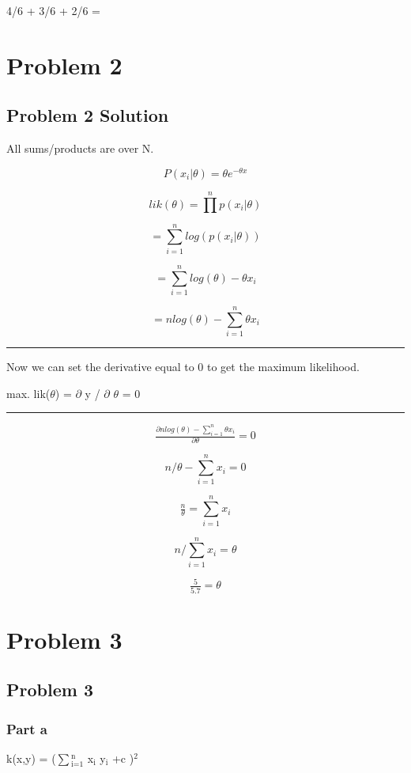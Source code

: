 \documentclass[11pt]{article}
\begin{document}
4/6 + 3/6 + 2/6 = 
\newpage

\section{Problem 2}
\label{sec-2}

\subsection{Problem 2 Solution}
\label{sec-2-1}

All sums/products are over N.

$$ P(x_i | \theta) = \theta e^{-\theta x} $$

$$lik(\theta) = \prod^n p(x_i |\theta) $$

$$= \sum_{i=1}^n log(p(x_i |\theta)) $$

$$= \sum_{i=1}^n log(\theta) - \theta x_i $$

$$= n log(\theta) - \sum_{i=1}^n \theta x_i $$

\rule{\linewidth}{0.5pt}

Now we can set the derivative equal to 0 to get the maximum likelihood.

max. lik($\theta$) = $\partial$ y / $\partial$ $\theta$ = 0

\rule{\linewidth}{0.5pt}

$$ \tfrac{\partial n log(\theta) - \sum_{i=1}^n \theta x_i}{\partial \theta} = 0 $$

$$ n/\theta - \sum_{i=1}^n x_i = 0 $$

$$ \tfrac{n}{\theta} = \sum_{i=1}^n x_i$$

$$ n/ \sum_{i=1}^n x_i = \theta$$

$$ \tfrac{5}{5.7} = \theta$$
\newpage

\section{Problem 3}
\label{sec-3}

\subsection{Problem 3}
\label{sec-3-1}

\subsubsection{Part a}
\label{sec-3-1-1}
k(x,y) = ($\sum$$_{\text{i=1}}^{\text{n}}$ x$_{\text{i}}$ y$_{\text{i}}$ +c )$^{\text{2}}$
\end{document}
